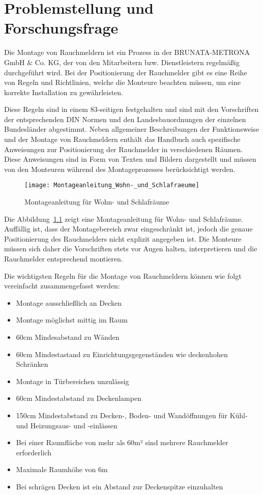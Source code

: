 \chapter{Problemstellung und Forschungsfrage} \label{cha:Problemstellung}

Die Montage von Rauchmeldern ist ein Prozess in der BRUNATA-METRONA GmbH \& Co. KG, der von den Mitarbeitern bzw. Dienstleistern regelmäßig durchgeführt wird. Bei der Positionierung der Rauchmelder gibt es eine Reihe von Regeln und Richtlinien, welche die Monteure beachten müssen, um eine korrekte Installation zu gewährleisten. 

Diese Regeln sind in einem 83-seitigen \citet{brunata2023handbuch} festgehalten und sind mit den Vorschriften der entsprechenden DIN Normen und den Landesbauordnungen der einzelnen Bundesländer abgestimmt. Neben allgemeiner Beschreibungen der Funktionsweise und der Montage von Rauchmeldern enthält das Handbuch auch spezifische Anweisungen zur Positionierung der Rauchmelder in verschiedenen Räumen. Diese Anweisungen sind in Form von Texten und Bildern dargestellt und müssen von den Monteuren während des Montageprozesses berücksichtigt werden.


\begin{figure}
\centering
\texttt{[image: Montageanleitung\_Wohn-\_und\_Schlafraeume]}
\caption{Montageanleitung für Wohn- und Schlafräume\label{fig:Anleitung}}\par
\end{figure}

Die Abbildung~\ref{fig:Anleitung} zeigt eine Montageanleitung für Wohn- und Schlafräume. Auffällig ist, dass der Montagebereich zwar eingeschränkt ist, jedoch die genaue Positionierung des Rauchmelders nicht explizit angegeben ist. Die Monteure müssen sich daher die Vorschriften stets vor Augen halten, interpretieren und die Rauchmelder entsprechend montieren. 

Die wichtigsten Regeln für die Montage von Rauchmeldern können wie folgt vereinfacht zusammengefasst werden:

\begin{itemize}
    \item Montage ausschließlich an Decken
    \item Montage möglichst mittig im Raum
    \item 60cm Mindesabstand zu Wänden
    \item 60cm Mindestastand zu Einrichtungsgegenständen wie deckenhohen Schränken
    \item Montage in Türbereichen unzulässig
    \item 60cm Mindestabstand zu Deckenlampen
    \item 150cm Mindestabstand zu Decken-, Boden- und Wandöffnungen für Kühl- und Heizungsaus- und -einlässen 
    \item Bei einer Raumfläche von mehr als 60m² sind mehrere Rauchmelder erforderlich
    \item Maximale Raumhöhe von 6m
    \item Bei schrägen Decken ist ein Abstand zur Deckenspitze einzuhalten
\end{itemize}


